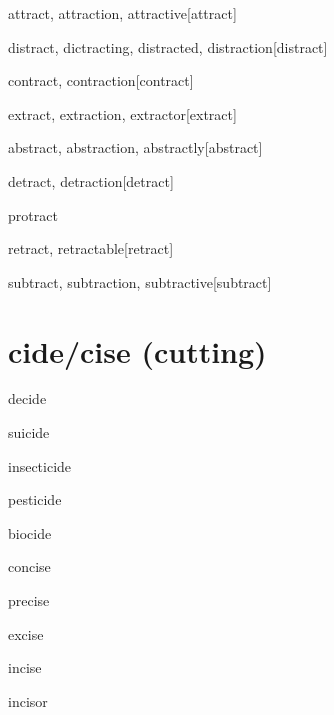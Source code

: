 \begin{RefWord}{attract, attraction, attractive}[attract]
\end{RefWord}

\begin{RefWord}{distract, dictracting, distracted, distraction}[distract]
\end{RefWord}

\begin{RefWord}{contract, contraction}[contract]
\end{RefWord}

\begin{RefWord}{extract, extraction, extractor}[extract]
\end{RefWord}

\begin{RefWord}{abstract, abstraction, abstractly}[abstract]
\end{RefWord}

\begin{RefWord}{detract, detraction}[detract]
\end{RefWord}

\begin{RefWord}{protract} 
\end{RefWord}

\begin{RefWord}{retract, retractable}[retract]
\end{RefWord}

\begin{RefWord}{subtract, subtraction, subtractive}[subtract]
\end{RefWord}

\section{cide/cise (cutting)}

\begin{RefWord}{decide}
\end{RefWord}

\begin{RefWord}{suicide}
\end{RefWord}

\begin{RefWord}{insecticide}
\end{RefWord}

\begin{RefWord}{pesticide}
\end{RefWord}

\begin{RefWord}{biocide}
\end{RefWord}

\begin{RefWord}{concise}
\end{RefWord}

\begin{RefWord}{precise}
\end{RefWord}

\begin{RefWord}{excise}
\end{RefWord}

\begin{RefWord}{incise}
\end{RefWord}

\begin{RefWord}{incisor}
\end{RefWord}




